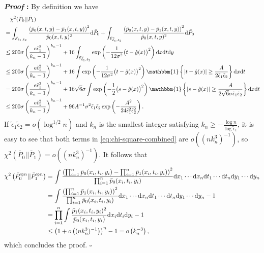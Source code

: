 \documentclass{article}
\def\eps{{\epsilon}}
\def\gE{{\mathcal{E}}}
\newcommand{\dd}{\textup{d}}
\renewenvironment{proof}{\noindent\textbf{\textit{Proof }:}}{\hfill$\square$}
\begin{document}
\begin{proof}
    By definition we have
    \begin{equation}
        \notag
        \begin{aligned}
            &\quad \chi^2(\bar{P}_0||\bar{P}_1) \\ &= \int_{\gE_{\tilde{\eps}_1,\tilde{\eps}_2}} \frac{\left(\bar{p}_0(x,t,y)-\bar{p}_1(x,t,y)\right)^2}{\bar{p}_0(x,t,y)^2} \dd \bar{P}_0 + \int_{\gE_{\tilde{\eps}_1,\tilde{\eps}_2}^c} \frac{\left(\bar{p}_0(x,t,y)-\bar{p}_1(x,t,y)\right)^2}{\bar{p}_0(x,t,y)^2} \dd \bar{P}_0 \\
            &\leq 200\sigma\left(\frac{e\tilde{\eps}_1^2}{k_n-1}\right)^{k_n-1} + 16\int_{\gE_{\tilde{\eps}_1,\tilde{\eps}_2}^c}\exp\left(-\frac{1}{12\sigma^2}\big(t-\hat{g}(x)\big)^2\right) \dd x \dd t \dd y \\
            &\leq 200\sigma\left(\frac{e\tilde{\eps}_1^2}{k_n-1}\right)^{k_n-1} + 16\int \exp\left(-\frac{1}{12\sigma^2}\big(t-\hat{g}(x)\big)^2\right) \mathbbm{1}\left\{ |t-\hat{g}(x)| \geq \frac{A}{2\tilde{\eps}_1\tilde{\eps}_2}\right\} \dd x\dd t \\
            &=  200\sigma\left(\frac{e\tilde{\eps}_1^2}{k_n-1}\right)^{k_n-1} + 16\sqrt{6}\sigma \int \exp\left(-\frac{1}{2}\big(s-\hat{g}(x)\big)^2\right) \mathbbm{1}\left\{ |s-\hat{g}(x)| \geq \frac{A}{2\sqrt{6}\sigma\tilde{\eps}_1\tilde{\eps}_2}\right\} \dd x\dd t \\
            &\leq 200\sigma\left(\frac{e\tilde{\eps}_1^2}{k_n-1}\right)^{k_n-1} + 96A^{-1}\sigma^2\tilde{\eps}_1\tilde{\eps}_2\exp\left(-\frac{A^2}{24\tilde{\eps}_1^2\tilde{\eps}_2^2}\right).
        \end{aligned}
    \end{equation}
    If $\tilde{\eps}_1\tilde{\eps}_2 = o\left(\log^{1/2}n\right)$ and $k_n$ is the smallest integer satisfying $k_n \geq -\frac{\log n}{\log \tilde{\eps}_1}$, it is easy to see that both terms in \eqref{eq:chi-square-combined} are $o\left((nk_n^3)^{-1}\right)$, so $\chi^2(\bar{P}_0||\bar{P}_1) = o\left((nk_n^3)^{-1}\right)$. It follows that
    \begin{equation}
        \notag
        \begin{aligned}
            \chi^2\left(\bar{P}_0^{\otimes n} || \bar{P}_1^{\otimes n}\right) &= \int \frac{\left(\prod_{i=1}^n\bar{p}_0(x_i,t_i,y_i)-\prod_{i=1}^n\bar{p}_1(x_i,t_i,y_i)\right)^2}{\prod_{i=1}^n\bar{p}_0(x_i,t_i,y_i)} \dd x_1\cdots\dd x_n\dd t_1\cdots\dd t_n\dd y_1\cdots \dd y_n \\
            &= \int \frac{\left(\prod_{i=1}^n\bar{p}_1(x_i,t_i,y_i)\right)^2}{\prod_{i=1}^n\bar{p}_0(x_i,t_i,y_i)} \dd x_1\cdots\dd x_n\dd t_1\cdots\dd t_n\dd y_1\cdots \dd y_n - 1 \\
            &= \prod_{i=1}^n \int \frac{\bar{p}_1(x_i,t_i,y_i)^2}{\bar{p}_0(x_i,t_i,y_i)} \dd x_i\dd t_i\dd y_i - 1 \\
            &\leq \left( 1+ o\left((nk_n^3)^{-1}\right)\right)^n - 1 = o\left(k_n^{-3}\right),
        \end{aligned}
    \end{equation}
    which concludes the proof.
\end{proof}
\end{document}
